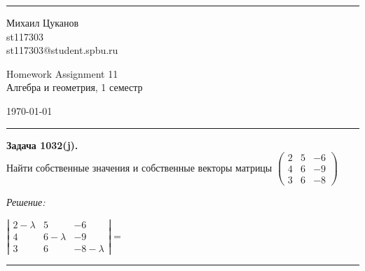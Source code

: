 \documentclass[a4paper, 12pt]{article}
\newenvironment{problem}[2][Задача]
    { \begin{mdframed}[backgroundcolor=gray!10] \textbf{#1 #2.} \\}
    {  \end{mdframed}}
\newenvironment{solution}
    {\textit{Решение: }}
    {\noindent\rule{7in}{1.5pt}}
\begin{document}

\fancyhead[C]{}
\hrule \medskip %
\begin{minipage}{0.295\textwidth}
\raggedright\footnotesize
Михаил Цуканов \hfill\\
st117303 \hfill\\
st117303@student.spbu.ru
\end{minipage}
\begin{minipage}{0.4\textwidth}
\centering\large
Homework Assignment 11\\
\normalsize
Алгебра и геометрия, 1 семестр\\
\end{minipage}
\begin{minipage}{0.295\textwidth}
\raggedleft
\today\hfill\\
\end{minipage}
\medskip\hrule
\bigskip




\begin{problem}{1032(j)}
Найти собственные значения и собственные векторы матрицы
$\left(\begin{array}{rrr}2 & 5 & -6 \\ 4 & 6 & -9 \\ 3 & 6 & -8 \end{array}\right)$

\end{problem}
\begin{solution}

$
\left|
\begin{array}{rrr}
2 - \lambda & 5 & -6 \\
4 & 6 - \lambda & -9 \\
3 & 6 & -8 - \lambda
\end{array}
\right|
=
$

\end{solution}
\end{document}
